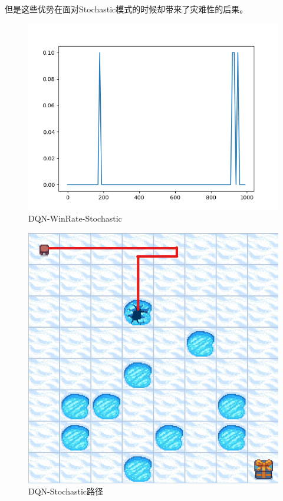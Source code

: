 \documentclass{thuemp}
\begin{document}
但是这些优势在面对Stochastic模式的时候却带来了灾难性的后果。
\begin{figure}[H]
  \centering
  \includegraphics[width=1\linewidth]{./img/result/dqn/dqn-winRate-smode.png}
  \caption{DQN-WinRate-Stochastic}
\end{figure}
\begin{figure}[H]
  \centering
  \includegraphics[width=0.8\linewidth]{./img/result/dqn/ddd.png}
  \caption{DQN-Stochastic路径}
\end{figure}
\end{document}
